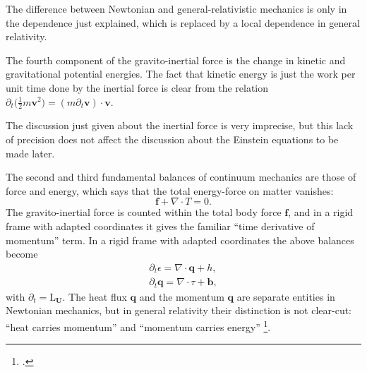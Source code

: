 \documentclass[\ifafour a4paper,12pt,\else a5paper,10pt,\fi%
onecolumn,oneside,article,%
british%
]{memoir}
\theoremstyle{remark}
\theoremstyle{innote}
\newcommand*{\citep}{\footcites}
\newcommand*{\de}{\partialup}%
\newcommand*{\di}{\mathrm{d}}%
\renewcommand*{\|}[1][]{\nonscript\,#1\vert\nonscript\;\mathopen{}}
\newcommand*{\Li}{\mathrm{L}}
\newcommand*{\yjj}{J}
\newcommand*{\yj}{\bm{\yjj}}
\newcommand*{\yQ}{h}
\newcommand*{\yqq}{q}
\newcommand*{\yq}{\bm{\yqq}}
\newcommand*{\yTT}{\tau}
\newcommand*{\yT}{\bm{\yTT}}
\newcommand*{\yTTf}{T}
\newcommand*{\ybb}{f}
\newcommand*{\yb}{\bm{\ybb}}
\newcommand*{\ybbf}{b}
\newcommand*{\ybf}{\bm{\ybbf}}
\newcommand*{\yvvt}{v}
\newcommand*{\yvt}{\bm{\yvvt}}
\newcommand*{\yFF}{U}
\newcommand*{\yF}{\bm{\yFF}}
\newcommand*{\yff}{f}
\newcommand*{\yf}{\bm{\yff}}
\newcommand*{\ypp}{q}
\newcommand*{\yp}{\bm{\ypp}}
\newcommand*{\yeen}{e}
\renewcommand*{\yen}{\bm{\yeen}}
\newcommand*{\ye}{\epsilon}
\newcommand*{\ynab}{\nabla}
\begin{document}
The difference between Newtonian and general-relativistic mechanics is only
in the dependence just explained, which is replaced by a local dependence in
general relativity.

The fourth component of the gravito-inertial force is the change in kinetic
and gravitational potential energies. The fact that kinetic energy is just
the work per unit time done by the inertial force is clear from the
relation $\de_t\bigl(\frac{1}{2}m\yvt^2\bigr) = (m\de_t\yvt) \cdot \yvt$.

The discussion just given about the inertial force is very imprecise, but
this lack of precision does not affect the discussion about the Einstein
equations to be made later.

\bigskip

The second and third fundamental balances of continuum mechanics are those
of force and energy, which says that the total energy-force on matter vanishes:
\begin{equation}
  \label{eq:force_balance}
  \yb + \ynab\cdot\yTTf = 0.
\end{equation}
The gravito-inertial force is counted within the total body force $\yb$,
and in a rigid frame with adapted coordinates it gives the familiar
\enquote{time derivative of momentum} term. In a rigid frame with adapted
coordinates the above balances become
\begin{gather}
  \label{eq:energy_balance_newtonian}
  \de_t \ye = \ynab\cdot\yq + \yQ,
  \\
  \de_t\yp = \ynab\cdot\yTT + \ybf,
\end{gather}
with $\de_t = \Li_{\yF}$. The heat flux $\yq$ and the momentum $\yq$ are
separate entities in Newtonian mechanics, but in general relativity their
distinction is not clear-cut: \enquote{heat carries momentum} and
\enquote{momentum carries energy} \citep{eckart1940c}.




\end{document}
